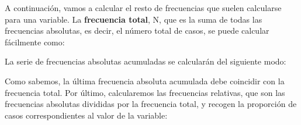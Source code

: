 \documentclass[
]{book}
\newenvironment{Shaded}{\begin{snugshade}}{\end{snugshade}}
\newcommand{\CommentTok}[1]{\textcolor[rgb]{0.56,0.35,0.01}{\textit{#1}}}
\newcommand{\FunctionTok}[1]{\textcolor[rgb]{0.13,0.29,0.53}{\textbf{#1}}}
\newcommand{\NormalTok}[1]{#1}
\newcommand{\OtherTok}[1]{\textcolor[rgb]{0.56,0.35,0.01}{#1}}
\newcommand{\SpecialCharTok}[1]{\textcolor[rgb]{0.81,0.36,0.00}{\textbf{#1}}}
\begin{document}
A continuación, vamos a calcular el resto de frecuencias que suelen calcularse para una variable.
La \textbf{frecuencia total}, N, que es la suma de todas las frecuencias absolutas, es decir, el número total de casos, se puede calcular fácilmente como:

\begin{Shaded}
\end{Shaded}

La serie de frecuencias absolutas acumuladas se calcularán del siguiente modo:

\begin{Shaded}
\end{Shaded}

Como sabemos, la última frecuencia absoluta acumulada debe coincidir con la frecuencia total.
Por último, calcularemos las frecuencias relativas, que son las frecuencias absolutas divididas por la frecuencia total, y recogen la proporción de casos correspondientes al valor de la variable:

\begin{Shaded}
\end{Shaded}
\end{document}
